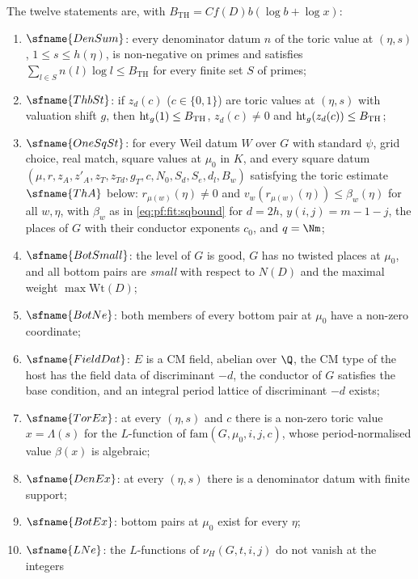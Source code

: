 The twelve statements are, with $B_{\mathrm{TH}}=Cf(D)b(\log b+\log x)$:
\begin{enumerate}[label=(S\arabic*),leftmargin=*]
\item\label{pf:fit:S:DenSum} $\sfname{DenSum}$: every denominator datum $n$ of the toric value at $(\eta,s)$, $1\le
s\le h(\eta)$, is non-negative on primes and satisfies $\sum_{l\in S}n(l)\log l\le B_{\mathrm{TH}}$ for every finite set
$S$ of primes;
\item\label{pf:fit:S:Thb} $\sfname{ThbSt}$: if $z_d(c)$ ($c\in\{0,1\}$) are toric values at $(\eta,s)$ with valuation
shift $g$, then $\operatorname{ht}_g(1)\le B_{\mathrm{TH}}$, $z_d(c)\ne0$ and $\operatorname{ht}_g(z_d(c))\le B_{\mathrm{TH}}$;
\item\label{pf:fit:S:One} $\sfname{OneSqSt}$: for every Weil datum $W$ over $G$ with standard $\psi$, grid choice, real
match, square values at $\mu_0$ in $K$, and every square datum $(\mu,r,z_A,z'_A,z_T,z_{Td},g_T,\allowbreak c,N_0,S_d,S_e,d_l,B_w)$
satisfying the toric estimate $\sfname{ThA}$ below: $r_{\mu(w)}(\eta)\ne0$ and
$v_w(r_{\mu(w)}(\eta))\le\beta_w(\eta)$ for all $w,\eta$, with $\beta_w$ as in \eqref{eq:pf:fit:sqbound} for $d=2h$,
$y(i,j)=m-1-j$, the places of $G$ with their conductor exponents $c_0$, and $q=\Nm$;
\item\label{pf:fit:S:BotSmall} $\sfname{BotSmall}$: the level of $G$ is good, $G$ has no twisted places at $\mu_0$, and all
bottom pairs are \emph{small} with respect to $N(D)$ and the maximal weight $\max\mathrm{Wt}(D)$;
\item\label{pf:fit:S:BotNe} $\sfname{BotNe}$: both members of every bottom pair at $\mu_0$ have a non-zero coordinate;
\item\label{pf:fit:S:Field} $\sfname{FieldDat}$: $E$ is a CM field, abelian over $\Q$, the CM type of the host has the
field data of discriminant $-d$, the conductor of $G$ satisfies the base condition, and an integral period lattice of
discriminant $-d$ exists;
\item\label{pf:fit:S:TorEx} $\sfname{TorEx}$: at every $(\eta,s)$ and $c$ there is a non-zero toric value $x=\Lambda(s)$ for
the $L$-function of $\mathrm{fam}(G,\mu_0,i,j,c)$, whose period-normalised value $\beta(x)$ is algebraic;
\item\label{pf:fit:S:DenEx} $\sfname{DenEx}$: at every $(\eta,s)$ there is a denominator datum with finite support;
\item\label{pf:fit:S:BotEx} $\sfname{BotEx}$: bottom pairs at $\mu_0$ exist for every $\eta$;
\item\label{pf:fit:S:LNe} $\sfname{LNe}$: the $L$-functions of $\nu_H(G,t,i,j)$ do not vanish at the integers

\end{enumerate}
